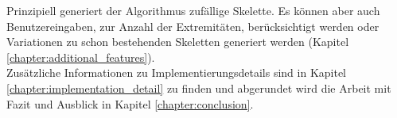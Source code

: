 \newpage
Prinzipiell generiert der Algorithmus zufällige Skelette. Es können aber auch Benutzereingaben, \zb zur Anzahl der Extremitäten, berücksichtigt werden oder Variationen zu schon bestehenden Skeletten generiert werden (Kapitel \ref{chapter:additional_features}). \\
Zusätzliche Informationen zu Implementierungsdetails sind in Kapitel \ref{chapter:implementation_detail} zu finden und abgerundet wird die Arbeit mit Fazit und Ausblick in Kapitel \ref{chapter:conclusion}.



